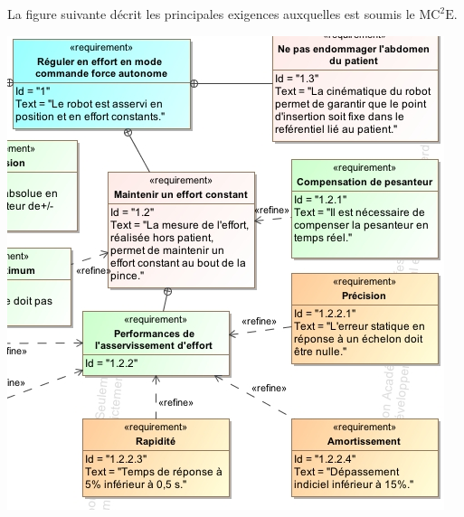 \documentclass[10pt,fleqn]{article} %
\begin{document}
\begin{multicols}{2}
La figure suivante décrit les principales exigences auxquelles est soumis le $\text{MC}^2\text{E}$.

\begin{center}
\includegraphics[width=\linewidth]{images/fig_05_BIS}
\end{center}



\end{multicols}
\end{document}
